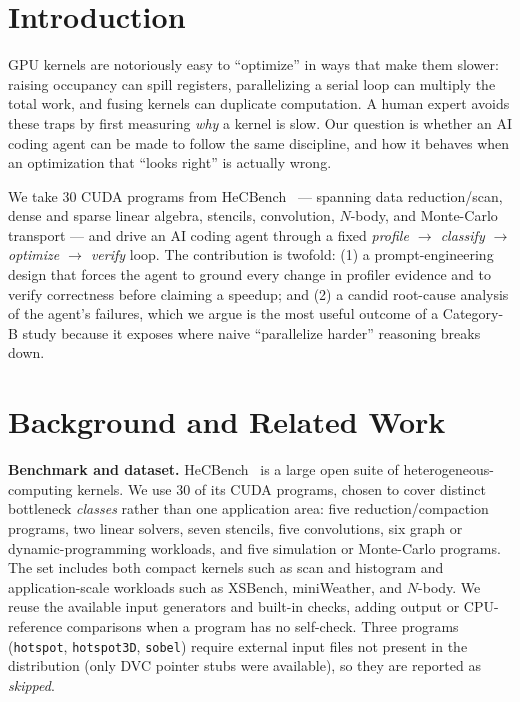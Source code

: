 \documentclass[conference]{IEEEtran}
\begin{document}
\vspace{0.5em}
\noindent{}

\section{Introduction}
GPU kernels are notoriously easy to ``optimize'' in ways that make them slower:
raising occupancy can spill registers, parallelizing a serial loop can multiply
the total work, and fusing kernels can duplicate computation. A human expert
avoids these traps by first measuring \emph{why} a kernel is slow. Our question is
whether an AI coding agent can be made to follow the same discipline, and how it
behaves when an optimization that ``looks right'' is actually wrong.

We take 30 CUDA programs from HeCBench~\cite{hecbench} --- spanning data
reduction/scan, dense and sparse linear algebra, stencils, convolution, $N$-body,
and Monte-Carlo transport --- and drive an AI coding agent through a fixed
\emph{profile $\rightarrow$ classify $\rightarrow$ optimize $\rightarrow$ verify}
loop. The contribution is twofold: (1) a prompt-engineering design that forces the
agent to ground every change in profiler evidence and to verify correctness before
claiming a speedup; and (2) a candid root-cause analysis of the agent's failures,
which we argue is the most useful outcome of a Category-B study because it exposes
where naive ``parallelize harder'' reasoning breaks down.

\section{Background and Related Work}
\textbf{Benchmark and dataset.}
HeCBench~\cite{hecbench} is a large open suite of heterogeneous-computing kernels.
We use 30 of its CUDA programs, chosen to cover distinct bottleneck
\emph{classes} rather than one application area: five reduction/compaction
programs, two linear solvers, seven stencils, five convolutions, six graph or
dynamic-programming workloads, and five simulation or Monte-Carlo programs.
The set includes both compact kernels such as scan and histogram and
application-scale workloads such as XSBench, miniWeather, and $N$-body.
We reuse the available input generators and built-in checks, adding output or
CPU-reference comparisons when a program has no self-check. Three programs
(\texttt{hotspot}, \texttt{hotspot3D}, \texttt{sobel}) require external input
files not present in the distribution (only DVC pointer stubs were available), so
they are reported as \emph{skipped}.
\end{document}
